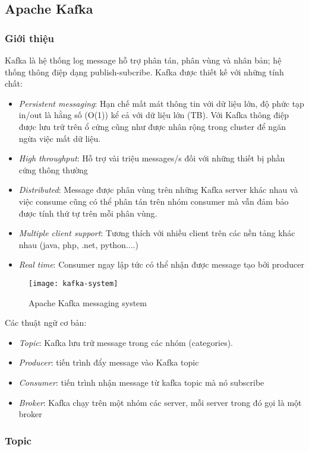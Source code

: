 \subsection{Apache Kafka}
\subsubsection{Giới thiệu}
Kafka là hệ thống log message hỗ trợ phân tán, phân vùng và nhân bản; hệ thống thông điệp dạng publish-subcribe. Kafka được thiết kế với những tính chất:
\begin{itemize}
	\item \textit{Persistent messaging}: Hạn chế mất mát thông tin với dữ liệu lớn, độ phức tạp in/out là hằng số (O(1)) kể cả với dữ liệu lớn (TB). Với Kafka thông điệp được lưu trữ trên ổ cứng cũng như được nhân rộng trong cluster để ngăn ngừa việc mất dữ liệu.
	\item \textit{High throughput}: Hỗ trợ vài triệu messages/s đối với những thiết bị phần cứng thông thường
	\item \textit{Distributed}: Message được phân vùng trên những Kafka server khác nhau và việc consume cũng có thể phân tán trên nhóm consumer mà vẫn đảm bảo được tính thứ tự trên mỗi phân vùng.
	\item \textit{Multiple client support}: Tương thích với nhiều client trên các nền tảng khác nhau (java, php, .net, python....)
	\item \textit{Real time}: Consumer ngay lập tức có thể nhận được message tạo bởi producer
\end{itemize}
\begin{figure}[h]
    \centering
    \texttt{[image: kafka-system]}
    \caption{Apache Kafka messaging system}
    \label{fig:kafka-system}
\end{figure}
Các thuật ngữ cơ bản:
\begin{itemize}
	\item \textit{Topic}: Kafka lưu trữ message trong các nhóm (categories).
	\item \textit{Producer}: tiến trình đẩy message vào Kafka topic
	\item \textit{Consumer}: tiến trình nhận message từ kafka topic mà nó subscribe
	\item \textit{Broker}: Kafka chạy trên một nhóm các server, mỗi server trong đó gọi là một broker
\end{itemize}
\subsubsection{Topic}

